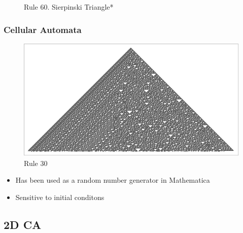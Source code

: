 \documentclass{beamer}
\begin{document}
\begin{frame}
\begin{figure}
        \caption{Rule 60. Sierpinski Triangle*}
    \end{figure}
\end{frame}


\begin{frame}
    \frametitle{Cellular Automata}
    \begin{figure}
        \includegraphics[scale=0.8]{rule30.pdf}
        \caption{Rule 30}
    \end{figure}
    \begin{itemize}
        \item Has been used as a random number generator in Mathematica
        \item Sensitive to initial conditons 
    \end{itemize}
\end{frame}
\subsection{2D CA}
\end{document}
